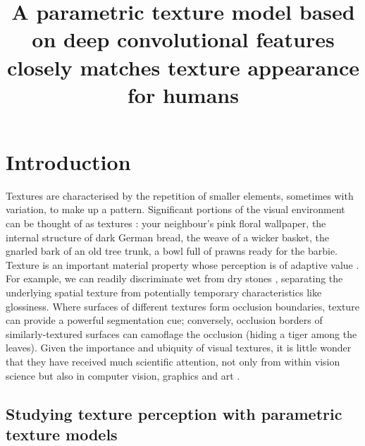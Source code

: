 \documentclass[article, 11pt,a4paper,natbib]{apa6}\usepackage[]{graphicx}\usepackage[]{color}
\title{
A parametric texture model based on deep convolutional features closely matches texture appearance for humans
}
\begin{document}
\maketitle









\section{Introduction}

Textures are characterised by the repetition of smaller elements, sometimes with variation, to make up a pattern. 
Significant portions of the visual environment can be thought of as textures \citep[``stuff'' as distinct from ``things'';][]{adelson_plenoptic_1991}: your neighbour's pink floral wallpaper, the internal structure of dark German bread, the weave of a wicker basket, the gnarled bark of an old tree trunk, a bowl full of prawns ready for the barbie. 
Texture is an important material property whose perception is of adaptive value \citep{adelson_seeing_2001, fleming_visual_2014}.  
For example, we can readily discriminate wet from dry stones \citep[e.g.][]{ho_conjoint_2008}, separating the underlying spatial texture from potentially temporary characteristics like glossiness.
Where surfaces of different textures form occlusion boundaries, texture can provide a powerful segmentation cue; conversely, occlusion borders of similarly-textured surfaces can camoflage the occlusion (hiding a tiger among the leaves).
Given the importance and ubiquity of visual textures, it is little wonder that they have received much scientific attention, not only from within vision science but also in computer vision, graphics and art \citep[see][for comprehensive recent reviews of this field]{dakin_seeing_2014,landy_texture_2013,pappas_rough_2013,rosenholtz_texture_2014}.

\subsection{Studying texture perception with parametric texture models}
\end{document}
